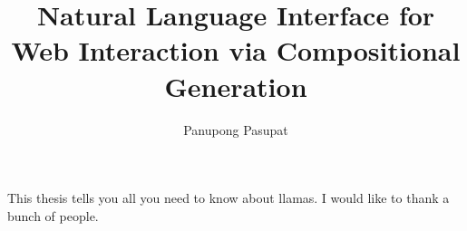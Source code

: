 \documentclass{report}
\begin{document}
\title{Natural Language Interface for Web Interaction via Compositional Generation}
\author{Panupong Pasupat}
 
\beforepreface
{}
This thesis tells you all you need to know about llamas.
I would like to thank a bunch of people.
\afterpreface



\appendix



\end{document}

